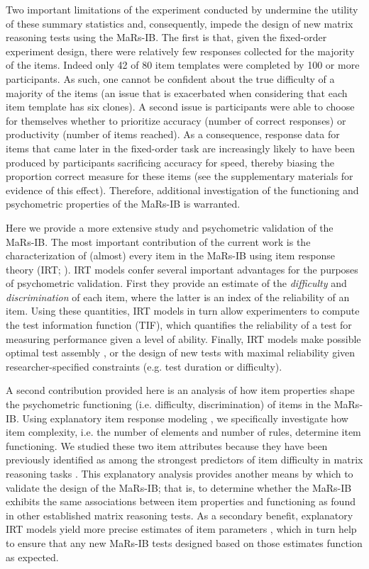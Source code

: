 \documentclass[a4paper,man,natbib,noextraspace]{apa6}
\begin{document}
Two important limitations of the experiment conducted by \cite{chierchia2019matrix} undermine the utility of these summary statistics and, consequently, impede the design of new matrix reasoning tests using the MaRs-IB. The first is that, given the fixed-order experiment design, there were relatively few responses collected for the majority of the items. Indeed only 42 of 80 item templates were completed by 100 or more participants. As such, one cannot be confident about the true difficulty of a majority of the items (an issue that is exacerbated when considering that each item template has six clones). A second issue is participants were able to choose for themselves whether to prioritize accuracy (number of correct responses) or productivity (number of items reached). As a consequence, response data for items that came later in the fixed-order task are increasingly likely to have been produced by participants sacrificing accuracy for speed, thereby biasing the proportion correct measure for these items (see the supplementary materials for evidence of this effect). Therefore, additional investigation of the functioning and psychometric properties of the MaRs-IB is warranted.

Here we provide a more extensive study and psychometric validation of the MaRs-IB. The most important contribution of the current work is the characterization of (almost) every item in the MaRs-IB using item response theory (IRT; \citealt{embretson2013item, de2013theory}). IRT models confer several important advantages for the purposes of psychometric validation. First they provide an estimate of the \textit{difficulty} and \textit{discrimination} of each item, where the latter is an index of the reliability of an item. Using these quantities, IRT models in turn allow experimenters to compute the test information function (TIF), which quantifies the reliability of a test for measuring performance given a level of ability. Finally, IRT models make possible optimal test assembly \citep{van1998optimal}, or the design of new tests with maximal reliability given researcher-specified constraints (e.g. test duration or difficulty).

A second contribution provided here is an analysis of how item properties shape the psychometric functioning (i.e. difficulty, discrimination) of items in the MaRs-IB. Using explanatory item response modeling \citep{de2004explanatory, wilson2008explanatory}, we specifically investigate how item complexity, i.e. the number of elements and number of rules, determine item functioning. We studied these two item attributes because they have been previously identified as among the strongest predictors of item difficulty in matrix reasoning tasks \citep{embretson1998cognitive, primi2001complexity}. This explanatory analysis provides another means by which to validate the design of the MaRs-IB; that is, to determine whether the MaRs-IB exhibits the same associations between item properties and functioning as found in other established matrix reasoning tests. As a secondary benefit, explanatory IRT models yield more precise estimates of item parameters \citep{neuhaus2006separating}, which in turn help to ensure that any new MaRs-IB tests designed based on those estimates function as expected.
\end{document}
